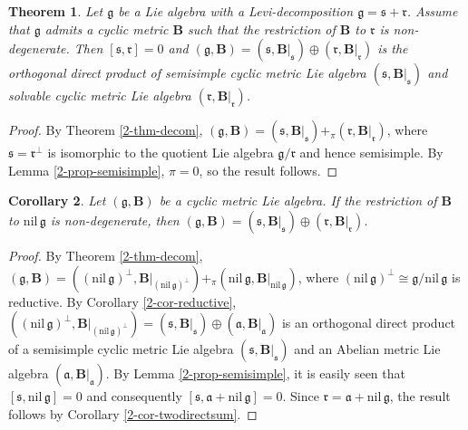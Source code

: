 \documentclass[reqno]{amsart}
\newtheorem{thm}{Theorem}[section]
\newtheorem{cor}[thm]{Corollary}
\theoremstyle{definition}
\begin{document}
\begin{thm}\label{2.3-thm-sol-nondege}
Let $\mathfrak{g}$ be a  Lie algebra with a Levi-decomposition $\mathfrak{g}=\mathfrak{s}+\mathfrak{r}$. Assume that $\mathfrak{g}$ admits a  cyclic metric
$\mathbf{B}$  such that the restriction of $\mathbf{B}$ to $\mathfrak{r}$ is non-degenerate.  Then $[\mathfrak{s},\mathfrak{r}]=0$ and
 $(\mathfrak{g},\mathbf{B})
 =(\mathfrak{s},\mathbf{B}|_{\mathfrak{s}})
 \oplus(\mathfrak{r},\mathbf{B}|_{\mathfrak{r}})$
  is the orthogonal direct product of semisimple cyclic metric Lie algebra
$(\mathfrak{s},\mathbf{B}|_{\mathfrak{s}})$
 and solvable cyclic metric Lie algebra $(\mathfrak{r},\mathbf{B}|_{\mathfrak{r}})$.
\end{thm}
\begin{proof}
By Theorem \ref{2-thm-decom},
$(\mathfrak{g},\mathbf{B})
=(\mathfrak{s},\mathbf{B}|_{\mathfrak{s}})+_{\pi}(\mathfrak{r},\mathbf{B}|_{\mathfrak{r}})$,
where $\mathfrak{s}=\mathfrak{r}^{\perp}$ is isomorphic to the quotient Lie algebra  $\mathfrak{g}/\mathfrak{r}$
and hence semisimple. By Lemma \ref{2-prop-semisimple}, $\pi=0$, so the result follows.
\end{proof}


\begin{cor}\label{2.3-cor-non-degenerate}
Let $(\mathfrak{g},\mathbf{B})$ be a cyclic metric Lie algebra.
If the restriction of $\mathbf{B}$ to $\mathrm{nil}\,\mathfrak{g}$ is non-degenerate,
 then
 $(\mathfrak{g},\mathbf{B})
  =(\mathfrak{s},\mathbf{B}|_{\mathfrak{s}})
 \oplus(\mathfrak{r},\mathbf{B}|_{\mathfrak{r}})$.
\end{cor}
\begin{proof}
By Theorem \ref{2-thm-decom},
$(\mathfrak{g},\mathbf{B})
=((\mathrm{nil}\,\mathfrak{g})^{\perp},\mathbf{B}|_{(\mathrm{nil}\,\mathfrak{g})^{\perp}})
+_{\pi}(\mathrm{nil}\,\mathfrak{g},\mathbf{B}|_{\mathrm{nil}\,\mathfrak{g}})$,
where $(\mathrm{nil}\,\mathfrak{g})^{\perp}\cong\mathfrak{g}/\mathrm{nil}\,\mathfrak{g}$ is reductive.
By Corollary \ref{2-cor-reductive}, $((\mathrm{nil}\,\mathfrak{g})^{\perp},\mathbf{B}|_{(\mathrm{nil}\,\mathfrak{g})^{\perp}})
=(\mathfrak{s},\mathbf{B}|_{\mathfrak{s}})\oplus(\mathfrak{a},\mathbf{B}|_{\mathfrak{a}})$
is an orthogonal direct product of  a semisimple cyclic metric Lie algebra $(\mathfrak{s},\mathbf{B}|_{\mathfrak{s}})$ and  an Abelian metric Lie algebra $(\mathfrak{a},\mathbf{B}|_{\mathfrak{a}})$.
By Lemma \ref{2-prop-semisimple}, it is easily seen that $[\mathfrak{s},\mathrm{nil}\,\mathfrak{g}]=0$ and consequently  $[\mathfrak{s},\mathfrak{a}+\mathrm{nil}\,\mathfrak{g}]=0$.
Since
$\mathfrak{r}=\mathfrak{a}+\mathrm{nil}\,\mathfrak{g}$,
the result follows by Corollary \ref{2-cor-twodirectsum}.
\end{proof}
\end{document}
